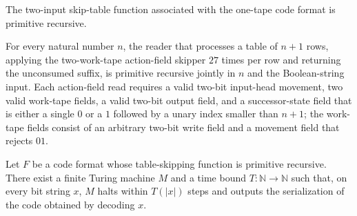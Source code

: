 \begin{lemma}
\label{Turing.codePrimSkipTable1}
\leanok
{}
The two-input skip-table function associated with the one-tape code format is primitive
recursive.
\end{lemma}

\begin{lemma}
\label{Turing.codePrimSkipTable2}
\leanok
{}
For every natural number $n$, the reader that processes a table of $n+1$ rows, applying
the two-work-tape action-field skipper $27$ times per row and returning the unconsumed
suffix, is primitive recursive jointly in $n$ and the Boolean-string input. Each
action-field read requires a valid two-bit input-head movement, two valid work-tape
fields, a valid two-bit output field, and a successor-state field that is either a
single $0$ or a $1$ followed by a unary index smaller than $n+1$; the work-tape fields
consist of an arbitrary two-bit write field and a movement field that rejects $01$.
\end{lemma}

\begin{theorem}
\label{Turing.CodeFormat.exists_canonizer}
\leanok
{}
Let $F$ be a code format whose table-skipping function is primitive recursive. There
exist a finite Turing machine $M$ and a time bound $T\colon\mathbb{N}\to\mathbb{N}$ such
that, on every bit string $x$, $M$ halts within $T(|x|)$ steps and outputs the
serialization of the code obtained by decoding $x$.
\end{theorem}
